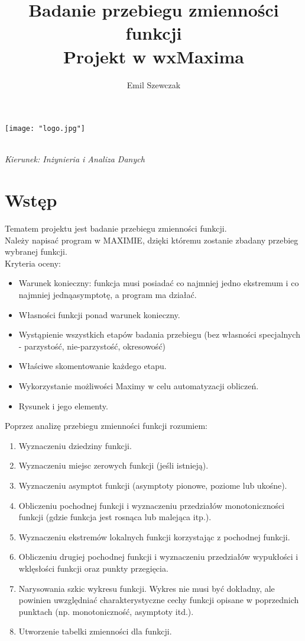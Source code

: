 \documentclass[a4paper,10pt]{article}
\title{Badanie przebiegu zmienności funkcji\\ \large{Projekt w wxMaxima}}
\begin{document}
\maketitle
\begin{center}
\texttt{[image: "logo.jpg"]}\\
\vspace{200pt}
\author{Emil Szewczak}\\
{\sl Kierunek: Inżynieria i Analiza Danych}
\end{center}

\newpage
\tableofcontents

\newpage
	
\section{Wstęp}
	Tematem projektu jest badanie przebiegu zmienności funkcji.\\
Należy napisać program w MAXIMIE, dzięki któremu zostanie zbadany przebieg wybranej funkcji.\\ Kryteria oceny:
\begin{itemize}
	\item Warunek konieczny: funkcja musi posiadać co najmniej jedno ekstremum i co najmniej jednąasymptotę, a program ma działać.
	\item Własności funkcji ponad warunek konieczny.
	\item Wystąpienie wszystkich etapów badania przebiegu (bez własności specjalnych - parzystość, nie-parzystość, okresowość)
	\item Właściwe skomentowanie każdego etapu.
	\item Wykorzystanie możliwości Maximy w celu automatyzacji obliczeń.
	\item Rysunek i jego elementy.
\end{itemize}
Poprzez analizę przebiegu zmienności funkcji rozumiem:  
\begin{enumerate}
\item Wyznaczeniu dziedziny funkcji.
\item Wyznaczeniu miejsc zerowych funkcji (jeśli istnieją).
\item Wyznaczeniu asymptot funkcji (asymptoty pionowe, poziome lub ukośne).
\item Obliczeniu pochodnej funkcji i wyznaczeniu przedziałów monotoniczności funkcji (gdzie funkcja jest rosnąca lub malejąca itp.).
\item Wyznaczeniu ekstremów lokalnych funkcji korzystając z pochodnej funkcji.
\item Obliczeniu drugiej pochodnej funkcji i wyznaczeniu przedziałów wypukłości i wklęsłości funkcji oraz punkty przegięcia.
\item Narysowania szkic wykresu funkcji. Wykres nie musi być dokładny, ale powinien uwzględniać charakterystyczne cechy funkcji opisane w poprzednich punktach (np. monotoniczność, asymptoty itd.).
\item Utworzenie tabelki zmienności dla funkcji.
\end{enumerate}
\end{document}
